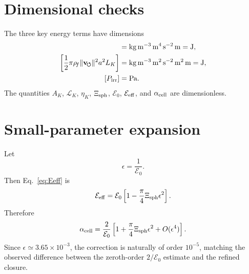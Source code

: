 \documentclass[11pt]{article}
\newcommand{\vnorm}{\lVert\mathbf{v}_{\!\boldsymbol{\circlearrowleft}}\rVert}
\newcommand{\rhof}{\rho_{\!f}}
\newcommand{\LK}{\mathcal L_K}
\newcommand{\Ezero}{\mathcal E_0}
\newcommand{\Eeff}{\mathcal E_{\rm eff}}
\newcommand{\Xisph}{\Xi_{\rm sph}}
\newcommand{\alphacell}{\alpha_{\rm cell}}
\begin{document}
\appendix

\section{Dimensional checks}

The three key energy terms have dimensions
\begin{align}
  [\rhof\Gamma_0^2L_K]
  &=
  \mathrm{kg\,m^{-3}}\,
  \mathrm{m^4\,s^{-2}}\,
  \mathrm{m}
  =
  \mathrm{J},\\
  \left[\frac{1}{2}\pi\rhof\vnorm^2a^2L_K\right]
  &=
  \mathrm{kg\,m^{-3}}\,
  \mathrm{m^2\,s^{-2}}\,
  \mathrm{m^2}\,
  \mathrm{m}
  =
  \mathrm{J},\\
  [P_{\rm irr}]
  &=
  \mathrm{Pa}.
\end{align}
The quantities \(A_K\), \(\LK\), \(\eta_K\), \(\Xisph\), \(\Ezero\), \(\Eeff\), and
\(\alphacell\) are dimensionless.

\section{Small-parameter expansion}

Let
\[
  \epsilon=\frac{1}{\Ezero}.
\]
Then Eq.~\eqref{eq:Eeff} is
\[
  \Eeff
  =
  \Ezero
  \left[
  1-\frac{\pi}{4}\Xisph\epsilon^2
  \right].
\]
Therefore
\[
  \alphacell
  =
  \frac{2}{\Ezero}
  \left[
  1+\frac{\pi}{4}\Xisph\epsilon^2
  +O(\epsilon^4)
  \right].
\]
Since \(\epsilon\simeq3.65\times10^{-3}\), the correction is naturally of order
\(10^{-5}\), matching the observed difference between the zeroth-order
\(2/\Ezero\) estimate and the refined closure.
\end{document}
